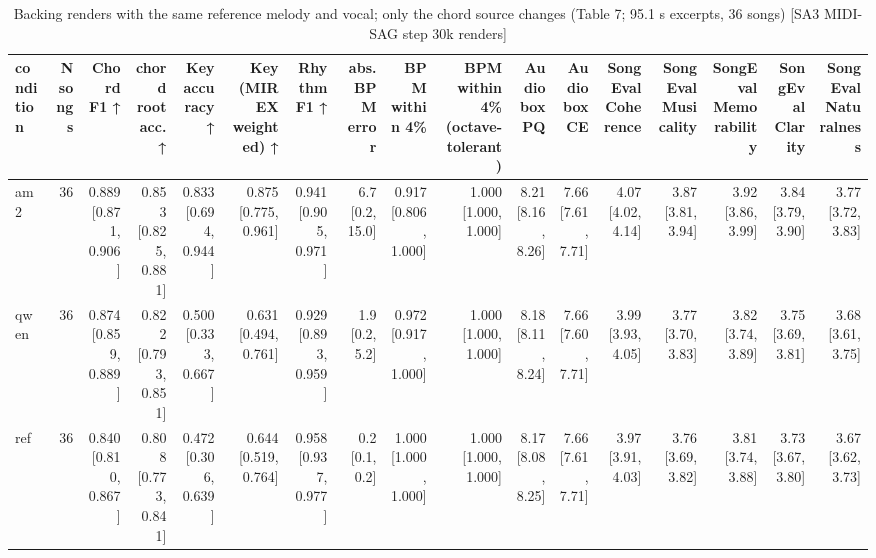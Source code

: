 \begin{table}[t]
\centering
\small
\begin{tabular}{lrrrrrrrrrrrrrrrr}
\toprule
condition & N songs & Chord F1 ↑ & chord root acc. ↑ & Key accuracy ↑ & Key (MIREX weighted) ↑ & Rhythm F1 ↑ & abs. BPM error & BPM within 4\% & BPM within 4\% (octave-tolerant) & Audiobox PQ & Audiobox CE & SongEval Coherence & SongEval Musicality & SongEval Memorability & SongEval Clarity & SongEval Naturalness \\
\midrule
am2 & 36 & 0.889 [0.871, 0.906] & 0.853 [0.825, 0.881] & 0.833 [0.694, 0.944] & 0.875 [0.775, 0.961] & 0.941 [0.905, 0.971] & 6.7 [0.2, 15.0] & 0.917 [0.806, 1.000] & 1.000 [1.000, 1.000] & 8.21 [8.16, 8.26] & 7.66 [7.61, 7.71] & 4.07 [4.02, 4.14] & 3.87 [3.81, 3.94] & 3.92 [3.86, 3.99] & 3.84 [3.79, 3.90] & 3.77 [3.72, 3.83] \\
qwen & 36 & 0.874 [0.859, 0.889] & 0.822 [0.793, 0.851] & 0.500 [0.333, 0.667] & 0.631 [0.494, 0.761] & 0.929 [0.893, 0.959] & 1.9 [0.2, 5.2] & 0.972 [0.917, 1.000] & 1.000 [1.000, 1.000] & 8.18 [8.11, 8.24] & 7.66 [7.60, 7.71] & 3.99 [3.93, 4.05] & 3.77 [3.70, 3.83] & 3.82 [3.74, 3.89] & 3.75 [3.69, 3.81] & 3.68 [3.61, 3.75] \\
ref & 36 & 0.840 [0.810, 0.867] & 0.808 [0.773, 0.841] & 0.472 [0.306, 0.639] & 0.644 [0.519, 0.764] & 0.958 [0.937, 0.977] & 0.2 [0.1, 0.2] & 1.000 [1.000, 1.000] & 1.000 [1.000, 1.000] & 8.17 [8.08, 8.25] & 7.66 [7.61, 7.71] & 3.97 [3.91, 4.03] & 3.76 [3.69, 3.82] & 3.81 [3.74, 3.88] & 3.73 [3.67, 3.80] & 3.67 [3.62, 3.73] \\
\bottomrule
\end{tabular}
\caption{Backing renders with the same reference melody and vocal; only the chord source changes (Table 7; 95.1 s excerpts, 36 songs) [SA3 MIDI-SAG step 30k renders]}
\label{tab:backing_chord_audio_sa3}
\end{table}
